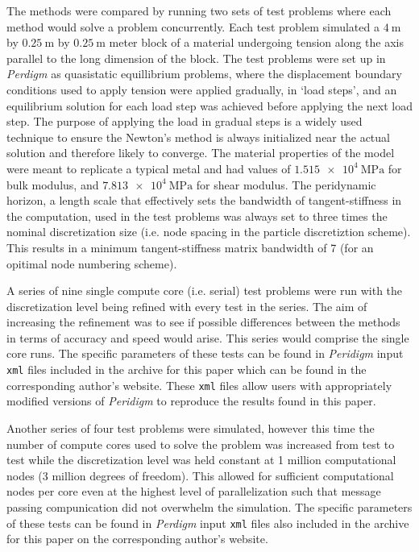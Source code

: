 \documentclass[preprint,12pt]{elsarticle}
\begin{document}
The methods were compared by running two sets of test problems where each method would solve a problem concurrently. Each test problem simulated a $\SI{4}{\meter}$ by $\SI{0.25}{\meter}$ by $\SI{0.25}{\meter}$ meter block of a material undergoing tension along the axis parallel to the long dimension of the block. The test problems were set up in \emph{Perdigm} as quasistatic equillibrium problems, where the displacement boundary conditions used to apply tension were applied gradually, in `load steps', and an equilibrium solution for each load step was achieved before applying the next load step. The purpose of applying the load in gradual steps is a widely used technique to ensure the Newton's method is always initialized near the actual solution and therefore likely to converge. The material properties of the model were meant to replicate a typical metal and had values of $\SI{1.515e4}{\mega\pascal}$ for bulk modulus, and $\SI{7.813e4}{\mega\pascal}$ for shear modulus. The peridynamic horizon, a length scale that effectively sets the bandwidth of tangent-stiffness in the computation, used in the test problems was always set to three times the nominal discretization size (i.e. node spacing in the particle discretiztion scheme). This results in a minimum tangent-stiffness matrix bandwidth of 7 (for an opitimal node numbering scheme).

A series of nine single compute core (i.e. serial) test problems were run with the discretization level being refined with every test in the series. The aim of increasing the refinement was to see if possible differences between the methods in terms of accuracy and speed would arise. This series would comprise the single core runs. The specific parameters of these tests can be found in \emph{Peridigm} input {\tt xml} files included in the archive for this paper which can be found in the corresponding author's website. These {\tt xml} files allow users with appropriately modified versions of \emph{Peridigm} to reproduce the results found in this paper.

Another series of four test problems were simulated, however this time the number of compute cores used to solve the problem was increased from test to test while the discretization level was held constant at 1 million computational nodes (3 million degrees of freedom). This allowed for sufficient computational nodes per core even at the highest level of parallelization such that message passing compunication did not overwhelm the simulation.   The specific parameters of these tests can be found in \emph{Perdigm} input {\tt xml} files also included in the archive for this paper on the corresponding author's website.
\end{document}
